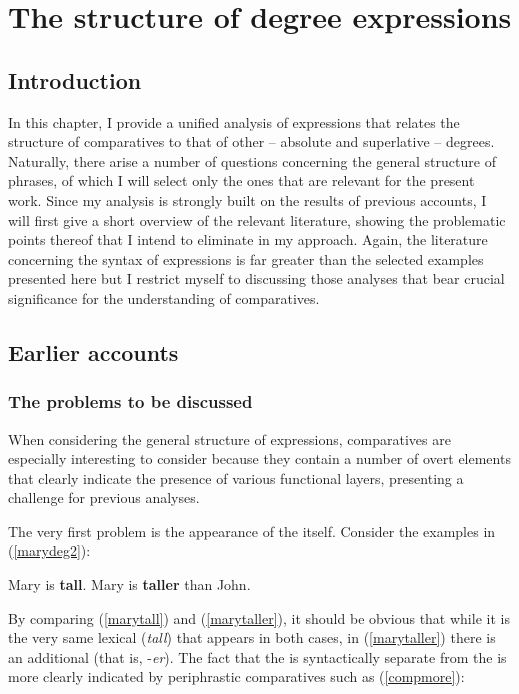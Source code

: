 \chapter{The structure of degree expressions} \label{ch:2}
\section{Introduction} \label{sec:2introduction}
In this chapter, I provide a unified analysis of  expressions that relates the structure of comparatives to that of other -- absolute and superlative -- degrees. Naturally, there arise a number of questions concerning the general structure of  phrases, of which I will select only the ones that are relevant for the present work. Since my analysis is strongly built on the results of previous accounts, I will first give a short overview of the relevant literature, showing the problematic points thereof that I intend to eliminate in my approach. Again, the literature concerning the syntax of  expressions is far greater than the selected examples presented here but I restrict myself to discussing those analyses that bear crucial significance for the understanding of comparatives.

\section{Earlier accounts} \label{sec:2earlier}
\subsection{The problems to be discussed} \label{sec:2theproblems}
When considering the general structure of  expressions, comparatives are especially interesting to consider because they contain a number of overt elements that clearly indicate the presence of various functional layers, presenting a challenge for previous analyses.

The very first problem is the appearance of the  itself. Consider the examples in (\ref{marydeg2}):

\ea \label{marydeg2}
\ea Mary is \textbf{tall}.\label{marytall}
\ex Mary is \textbf{taller} than John.\label{marytaller}
\z
\z

By comparing (\ref{marytall}) and (\ref{marytaller}), it should be obvious that while it is the very same lexical  (\textit{tall}) that appears in both cases, in (\ref{marytaller}) there is an additional  (that is, -\textit{er}). The fact that the  is syntactically separate from the  is more clearly indicated by periphrastic comparatives such as (\ref{compmore}):

